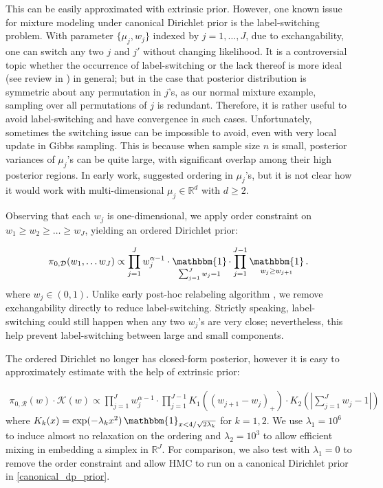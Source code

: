 \documentclass[10pt]{article}
\newcommand{\bb}[1]{\mathbb{#1}}
\newcommand{\mc}[1]{\mathcal{#1}}
\DeclareMathOperator{\1}{\mathbbm{1}}
\begin{document}
This can be easily approximated with extrinsic prior. However, one known issue for mixture modeling under canonical Dirichlet prior is the label-switching problem. With parameter $\{\mu_j,w_j\}$ indexed by $j=1,\ldots,J$, due to exchangability, one can switch any two $j$ and $j'$ without changing likelihood. It is a controversial topic whether the occurrence of label-switching or the lack thereof is more ideal (see review in \cite{jasra2005markov}) in general; but in the case that posterior distribution is symmetric about any permutation in $j$'s, as our normal mixture example, sampling over all permutations of $j$ is redundant. Therefore, it is rather useful to avoid label-switching and have convergence in such cases. Unfortunately, sometimes the switching issue can be impossible to avoid, even with very local update in Gibbs sampling. This is because when sample size $n$ is small, posterior variances of $\mu_j$'s can be quite large, with significant overlap among their high posterior regions. In early work, \cite{diebolt1994estimation} suggested ordering in $\mu_j$'s, but it is not clear how it would work with multi-dimensional $\mu_j\in \bb R^d$ with $d\ge 2$.

Observing that each $w_j$ is one-dimensional, we apply order constraint on $w_1 \ge w_2 \ge \ldots \ge w_J$, yielding an ordered Dirichlet prior:

 \begin{equation}
\begin{aligned}
\label{ordered_dp_prior}
\pi_{0, \mc D}(w_1,\ldots w_J) \propto \prod_{j=1}^J w_j^{\alpha-1} \cdot \1_{\sum_{j=1}^J w_j=1} \cdot  \prod_{j=1}^{J-1}\1_{w_j \ge w_{j+1}}.
\end{aligned}
\end{equation}
where $w_j\in (0,1)$. Unlike early post-hoc relabeling algorithm \citep{stephens2000dealing}, we remove exchangability directly to reduce label-switching. Strictly speaking, label-switching could still happen when any two $w_j$'s are very close; nevertheless, this help prevent label-switching between large and small components.

The ordered Dirichlet no longer has closed-form posterior, however it is easy to approximately estimate with the help of extrinsic prior:

 \begin{equation*}
\begin{aligned}
\pi_{0,\mc R}(w)\cdot \mc K(w) \propto \prod_{j=1}^J w_j^{\alpha-1} \cdot \prod_{j=1}^{J-1} K_{1}{\left(( w_{j+1} - w_j )_+\right)} \cdot K_2 ( |{\sum_{j=1}^J w_j - 1}|)
\end{aligned}
\end{equation*}
where $K_{k}(x)=\exp(- \lambda_k x^2) \1_{x<4/\sqrt{2\lambda_k}}$ for  $k=1,2$. We use $\lambda_1 = 10^6$ to induce almost no relaxation on the ordering and $\lambda_2 = 10^3$ to allow efficient mixing in embedding a simplex in $\mathbb{R}^J$. For comparison, we also test with $\lambda_1=0$ to remove the order constraint and allow HMC to run on a canonical Dirichlet prior in \eqref{canonical_dp_prior}.
\end{document}
